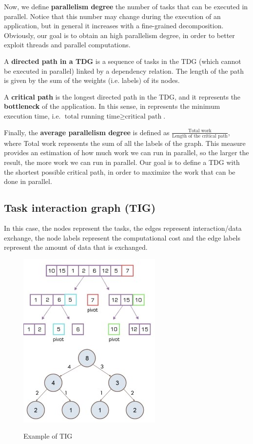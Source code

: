 Now, we define \textbf{parallelism degree} the number of tasks that can be executed in parallel. Notice that this number may change during the execution of an application, but in general it increases with a fine-grained decomposition. Obviously, our goal is to obtain an high parallelism degree, in order to better exploit threads and parallel computations.

A \textbf{directed path in a TDG} is a sequence of tasks in the TDG (which cannot be executed in parallel) linked by a dependency relation. The length of the path is given by the sum of the weights (i.e. labels) of its nodes.

A \textbf{critical path} is the longest directed path in the TDG, and it represents the \textbf{bottleneck} of the application. In this sense, in represents the minimum execution time, i.e. $\text{total running time} \geq \text{critical path}$.

Finally, the \textbf{average parallelism degree} is defined as $\frac{\text{Total work}}{\text{Length of the critical path}}$, where Total work represents the sum of all the labels of the graph. This measure provides an estimation of how much work we can run in parallel, so the larger the result, the more work we can run in parallel. Our goal is to define a TDG with the shortest possible critical path, in order to maximize the work that can be done in parallel.

\subsection{Task interaction graph (TIG)}
In this case, the nodes represent the tasks, the edges represent interaction/data exchange, the node labels represent the computational cost and the edge labels represent the amount of data that is exchanged.

\begin{figure}[h!]
		\centering
		\includegraphics[scale = 2.0]{img/tig.jpg}
        \label{tig}
        \caption{Example of TIG}
\end{figure}


